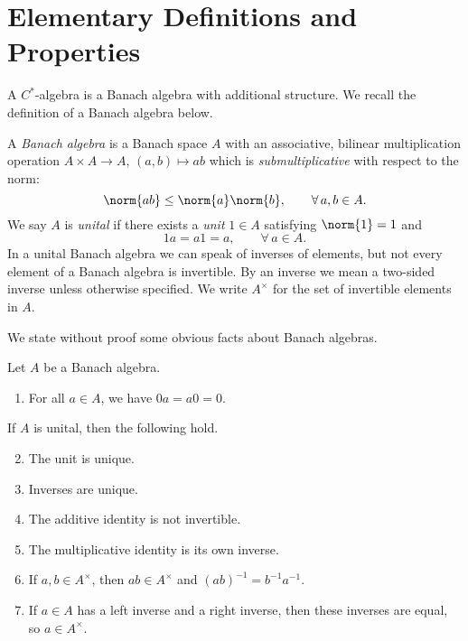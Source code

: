 \newcommand{\defeq}{\vcentcolon=}
\newcommand{\tn}[1]{\textnormal{#1}}

\section{Elementary Definitions and Properties}
\label{sec:c*-algebras-elementary-definitions-properties}

A $C^*$-algebra is a Banach algebra with additional structure. We recall the definition of a Banach algebra below.

\begin{definition}
A \emph{Banach algebra} is a Banach space $A$ with an associative, bilinear multiplication operation $A \times A \rightarrow A$, $(a,b) \mapsto ab$ which is \emph{submultiplicative} with respect to the norm:
\begin{equation}\label{eq:submultiplicativity}
\norm{ab} \leq \norm{a} \norm{b}, \qquad \forall \, a, b \in A.
\end{equation}
We say $A$ is \emph{unital} if there exists a \emph{unit} $1 \in A$ satisfying $\norm{1} = 1$ and
\begin{equation}\label{eq:algebra_unit}
1a = a1 = a, \qquad \forall \, a \in A.
\end{equation}
In a unital Banach algebra we can speak of inverses of elements, but not every element of a Banach algebra is invertible. By an inverse we mean a two-sided inverse unless otherwise specified. We write $A^\times$ for the set of invertible elements in $A$. 
\end{definition}





We state without proof some obvious facts about Banach algebras.

\begin{proposition}
Let $A$ be a Banach algebra. 
\begin{enumerate}
	\item For all $a \in A$, we have $0a = a0 = 0$. 
\end{enumerate}
If $A$ is unital, then the following hold.
\begin{enumerate}\setcounter{enumi}{1}
	\item The unit is unique.
	\item Inverses are unique.
	\item The additive identity is not invertible.
	\item The multiplicative identity is its own inverse.
	\item If $a, b \in A^\times$, then $ab \in A^\times$ and $(ab)^{-1} = b^{-1}a^{-1}$.
	\item If $a \in A$ has a left inverse and a right inverse, then these inverses are equal, so $a \in A^\times$.
\end{enumerate}
\end{proposition}





